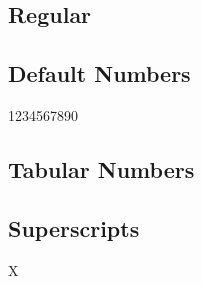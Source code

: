 \documentclass{article}
\begin{document}
\subsection*{Regular}
\lipsum[1]

\subsection*{Default Numbers}
1234567890

\subsection*{Tabular Numbers}
{}


\subsection*{Superscripts}
X{}
\end{document}
